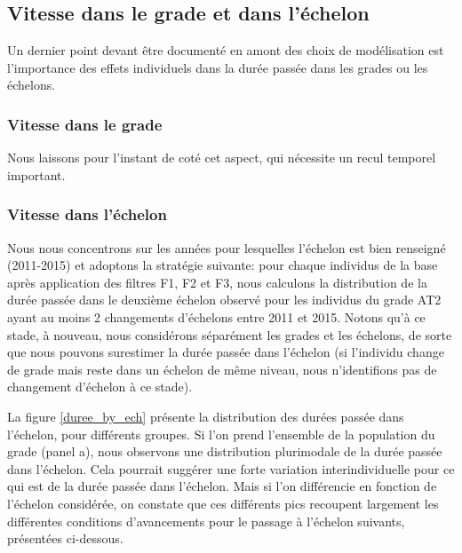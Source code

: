 \documentclass[11pt,a4paper]{article}
\begin{document}
\clearpage
\subsection{Vitesse dans le grade et dans l'échelon}

Un dernier point devant être documenté en amont des choix de modélisation est l'importance des effets individuels dans la durée passée dans les grades ou les échelons. 

\subsubsection*{Vitesse dans le grade}

Nous laissons pour l'instant de coté cet aspect, qui nécessite un recul temporel important. 

\subsubsection*{Vitesse dans l'échelon}

Nous nous concentrons sur les années pour lesquelles l'échelon est bien renseigné (2011-2015) et adoptons la stratégie suivante: pour chaque individus de la base après application des filtres F1, F2 et F3, nous calculons la distribution de la durée passée dans le deuxième échelon observé pour les individus du grade AT2 ayant au moins 2 changements d'échelons entre 2011 et 2015. Notons qu'à ce stade, à nouveau, nous considérons séparément les grades et les échelons, de sorte que nous pouvons surestimer la durée passée dans l'échelon (si l'individu change de grade mais reste dans un échelon de même niveau, nous n'identifions pas de changement d'échelon à ce stade). 

La figure \ref{duree_by_ech} présente la distribution des durées passée dans l'échelon, pour différents groupes. 
Si l'on prend l'ensemble de la population du grade (panel a), nous observons une distribution plurimodale de la durée passée dans l'échelon. Cela pourrait suggérer une forte variation interindividuelle pour ce qui est de la durée passée dans l'échelon. Mais si l'on différencie en fonction de l'échelon considérée, on constate que ces différents pics recoupent largement les différentes conditions d'avancements pour le passage à l'échelon suivants, présentées ci-dessous. 
\end{document}
